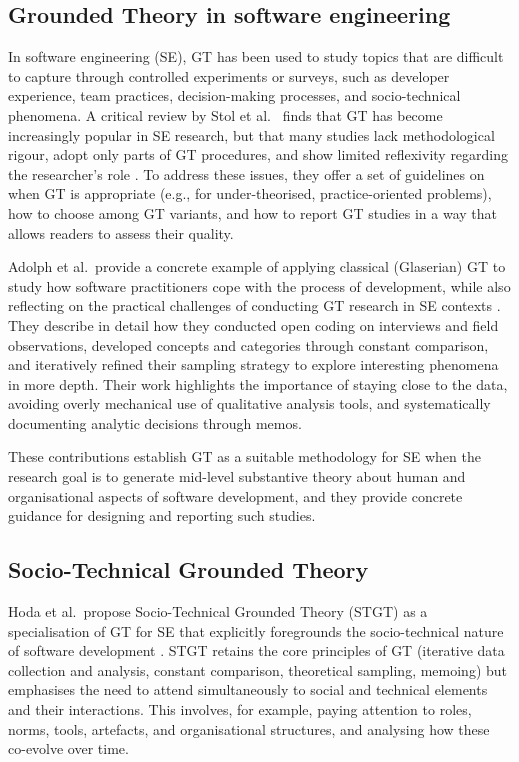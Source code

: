 \subsection{Grounded Theory in software engineering}
\label{subsec:gt_in_se}

In software engineering (SE), GT has been used to study topics that are difficult to capture through controlled experiments or surveys, such as developer experience, team practices, decision-making processes, and socio-technical phenomena. A critical review by Stol et al.\ \cite{stol2016grounded} finds that GT has become increasingly popular in SE research, but that many studies lack methodological rigour, adopt only parts of GT procedures, and show limited reflexivity regarding the researcher's role \cite{stol2016grounded}. To address these issues, they offer a set of guidelines on when GT is appropriate (e.g., for under-theorised, practice-oriented problems), how to choose among GT variants, and how to report GT studies in a way that allows readers to assess their quality.

Adolph et al.\ provide a concrete example of applying classical (Glaserian) GT to study how software practitioners cope with the process of development, while also reflecting on the practical challenges of conducting GT research in SE contexts \cite{adolph2011using}. They describe in detail how they conducted open coding on interviews and field observations, developed concepts and categories through constant comparison, and iteratively refined their sampling strategy to explore interesting phenomena in more depth. Their work highlights the importance of staying close to the data, avoiding overly mechanical use of qualitative analysis tools, and systematically documenting analytic decisions through memos.

These contributions establish GT as a suitable methodology for SE when the research goal is to generate mid-level substantive theory about human and organisational aspects of software development, and they provide concrete guidance for designing and reporting such studies.

\subsection{Socio-Technical Grounded Theory}
\label{subsec:stgt}

Hoda et al.\ propose Socio-Technical Grounded Theory (STGT) as a specialisation of GT for SE that explicitly foregrounds the socio-technical nature of software development \cite{hoda2018socio}. STGT retains the core principles of GT (iterative data collection and analysis, constant comparison, theoretical sampling, memoing) but emphasises the need to attend simultaneously to social and technical elements and their interactions. This involves, for example, paying attention to roles, norms, tools, artefacts, and organisational structures, and analysing how these co-evolve over time.

